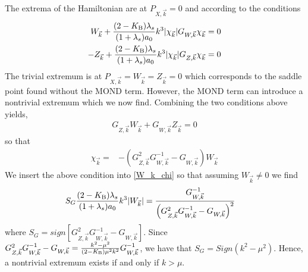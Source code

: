 \documentclass[twocolumn,prd,preprintnumbers,amsmath,amssymb,nofootinbib,superscriptaddress]{revtex4-1}
\newcommand{\lambdas}{\lambda_s}
\newcommand{\KB}{\ensuremath{K_{{\rm B}}}}
\begin{document}
The extrema of the Hamiltonian are at $P_{X,\vec{k}} = 0$ and according to the conditions
\begin{align}
 W_{\vec{k}} + \frac{(2-\KB)\lambdas}{ (1+\lambdas) a_0} k^3  |\chi_{\vec{k}}|   G_{W,\vec{k}} \chi_{\vec{k}}    &= 0
\label{W_k_chi}
\\
-Z_{\vec{k}} + \frac{(2-\KB)\lambdas}{ (1+\lambdas) a_0} k^3  |\chi_{\vec{k}}|   G_{Z,\vec{k}} \chi_{\vec{k}}   &= 0 
\end{align}
The trivial extremum is at $P_{X,\vec{k}}  = W_{\vec{k}}  = Z_{\vec{k}} = 0$ which corresponds to the saddle point found without the MOND term. However, the MOND term can introduce 
a nontrivial extremum which we now find. Combining the two conditions above yields,
\begin{align}
  G_{Z,\vec{k}}  W_{\vec{k}} + G_{W,\vec{k}} Z_{\vec{k}}  = 0
\end{align}
so that
\begin{align}
\chi_{\vec{k}} =&  -\left(G_{Z,\vec{k}}^2  G_{W,\vec{k}}^{-1} - G_{W,\vec{k}} \right) W_{\vec{k}}
\end{align}
We insert the above condition into \eqref{W_k_chi} so that assuming $ W_{\vec{k}}\ne 0$ we find 
\begin{align}
 S_G \frac{(2-\KB)\lambdas}{ (1+\lambdas) a_0} k^3  |W_{\vec{k}}|  
  &= \frac{ G_{W,\vec{k}}^{-1}}{\left(    G_{Z,\vec{k}}^2  G_{W,\vec{k}}^{-1}   -G_{W,\vec{k}} \right)^2 }
\end{align}
where $S_G = sign[ G_{Z,\vec{k}}^2  G_{W,\vec{k}}^{-1}   -G_{W,\vec{k}} ]$. Since $ G_{Z,\vec{k}}^2  G_{W,\vec{k}}^{-1}   -G_{W,\vec{k}} = 
 \frac{k^2-\mu^2}{(2-\KB) \mu^2 k^2 } G_{W,\vec{k}}^{-1} $, we have that 
$S_G = Sign(k^2-\mu^2)$. Hence, a nontrivial  extremum exists if and only if $k>\mu$.
\end{document}
